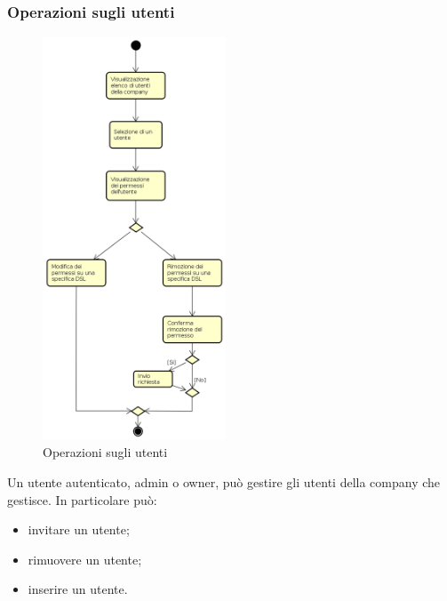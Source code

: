 \subsubsection{Operazioni sugli utenti}
\begin{figure}[H]
\begin{center}
\includegraphics[height=12cm]{res/sections/backend/activities/operazioniSuUtenti.png}
\caption{Operazioni sugli utenti}
\end{center}
\end{figure}
Un utente autenticato, admin o owner, può gestire gli utenti della company che gestisce. In particolare può:
\begin{itemize}
\item invitare un utente;
\item rimuovere un utente;
\item inserire un utente.
\end{itemize}
